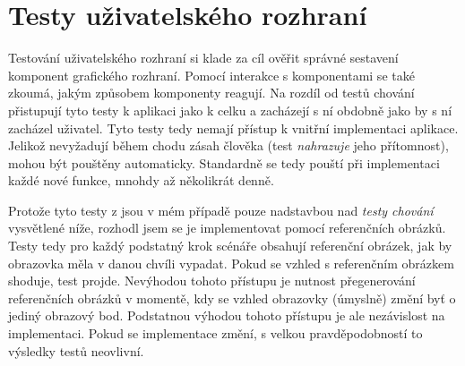 \section{Testy uživatelského rozhraní}\label{testovani-ui}


Testování uživatelského rozhraní si klade za cíl ověřit správné sestavení komponent grafického rozhraní.
Pomocí interakce s komponentami se také zkoumá, jakým způsobem komponenty reagují.
Na rozdíl od testů chování přistupují tyto testy k aplikaci jako k celku a zacházejí s ní obdobně jako by s ní zacházel uživatel. Tyto testy tedy nemají přístup k vnitřní implementaci aplikace.
Jelikož nevyžadují během chodu zásah člověka (test \textit{nahrazuje} jeho přítomnost), mohou být pouštěny automaticky.
Standardně se tedy pouští při implementaci každé nové funkce, mnohdy až několikrát denně. \cite{apple-ui-testing}

Protože tyto testy z jsou v mém případě pouze nadstavbou nad \textit{testy chování} vysvětlené níže, rozhodl jsem se je implementovat pomocí referenčních obrázků.
Testy tedy pro každý podstatný krok scénáře obsahují referenční obrázek, jak by obrazovka měla v danou chvíli vypadat.
Pokud se vzhled s referenčním obrázkem shoduje, test projde.
Nevýhodou tohoto přístupu je nutnost přegenerování referenčních obrázků v momentě, kdy se vzhled obrazovky (úmyslně) změní byť o jediný obrazový bod.
Podstatnou výhodou tohoto přístupu je ale nezávislost na implementaci.
Pokud se implementace změní, s velkou pravděpodobností to výsledky testů neovlivní.